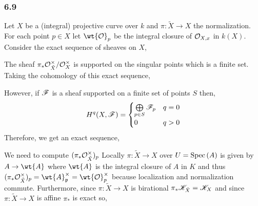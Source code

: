 \documentclass[12pt]{article}
\begin{document}
\subsubsection{6.9}

Let $X$ be a (integral) projective curve over $k$ and $\pi : \tilde{X} \to X$ the normalization. For each point $p \in X$ let $\wt{\mathcal{O}}_{p}$ be the integral closure of $\mathcal{O}_{X, x}$ in $k(X)$. Consider the exact sequence of sheaves on $X$,
\begin{center}
\end{center}
The sheaf $\pi_* \mathcal{O}_{\tilde{X}}^\times / \mathcal{O}_{X}^\times$ is supported on the singular points which is a finite set. Taking the cohomology of this exact sequence,
\begin{center}
\end{center}
However, if $\mathscr{F}$ is a sheaf supported on a finite set of points $S$ then,
\[ H^q(X, \mathscr{F}) = 
\begin{cases}
\bigoplus\limits_{p \in S} \mathscr{F}_p & q = 0
\\
0 & q > 0
\end{cases} \]
Therefore, we get an exact sequence,
\begin{center}
\end{center}
We need to compute $(\pi_* \mathcal{O}_{\tilde{X}}^\times)_p$ Locally $\pi : \tilde{X} \to X$ over $U = \mathrm{Spec}\left( A \right)$ is given by $A \to \wt{A}$ where $\wt{A}$ is the integral closure of $A$ in $K$ and thus $(\pi_* \struct{\tilde{X}}^\times)_p = \wt{A}_\p^\times = \wt{\mathcal{O}}^\times_{p}$ because localization and normalization commute. Furthermore, since $\pi : \tilde{X} \to X$ is birational $\pi_* \mathscr{K}_{\tilde{X}} = \mathscr{K}_X$ and since $\pi : \tilde{X} \to X$ is affine $\pi_*$ is exact so,
\end{document}
